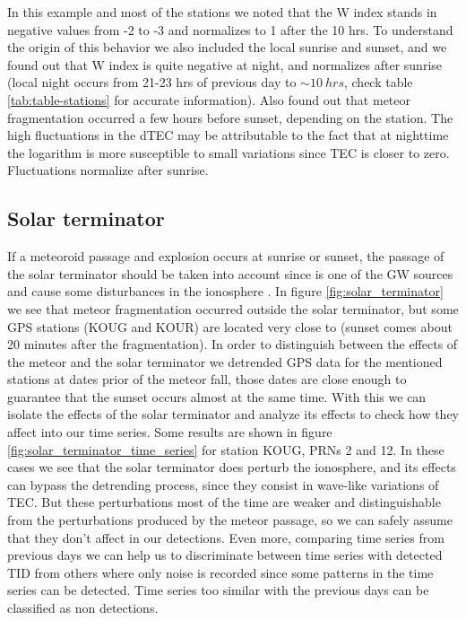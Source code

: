 In this example and most of the stations we noted that the W index stands in negative values from -2 to -3 and normalizes to 1 after the 10 hrs. To understand the origin of this behavior we also included the local sunrise and sunset, and we found out that W index is quite negative at night, and normalizes after sunrise (local night occurs from 21-23 hrs of previous day to $\sim \SI{10}{hrs}$, check table \ref{tab:table-stations} for accurate information). Also found out that meteor fragmentation occurred a few hours before sunset, depending on the station. The high fluctuations in the dTEC may be attributable to the fact that at nighttime the logarithm is more susceptible to small variations since TEC is closer to zero. Fluctuations normalize after sunrise.

\subsection{Solar terminator}

If a meteoroid passage and explosion occurs at sunrise or sunset, the passage of the solar terminator should be taken into account since is one of the GW sources and cause some disturbances in the ionosphere \citep{Somsikov:2011}. In figure \ref{fig:solar_terminator} we see that meteor fragmentation occurred outside the solar terminator, but some GPS stations (KOUG and KOUR) are located very close to (sunset comes about 20 minutes after the fragmentation). In order to distinguish between the effects of the meteor and the solar terminator we detrended GPS data for the mentioned stations at dates prior of the meteor fall, those dates are close enough to guarantee that the sunset occurs almost at the same time. With this we can isolate the effects of the solar terminator and analyze its effects to check how they affect into our time series. Some results are shown in figure \ref{fig:solar_terminator_time_series} for station KOUG, PRNs 2 and 12. In these cases we see that the solar terminator does perturb the ionosphere, and its effects can bypass the detrending process, since they consist in wave-like variations of TEC. But these perturbations most of the time are weaker and distinguishable from the perturbations produced by the meteor passage, so we can safely assume that they don't affect in our detections. Even more, comparing time series from previous days we can help us to discriminate between time series with detected TID from others where only noise is recorded since some patterns in the time series can be detected. Time series too similar with the previous days can be classified as non detections.


